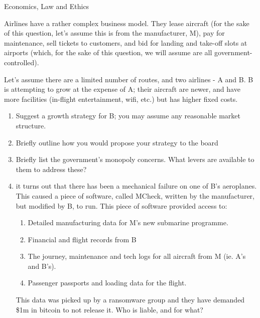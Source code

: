 \documentclass{tripos}  %
\begin{document}
\begin{question}[MockIB,year=2024,paper=2,question=3,author=rrw]{Economics, Law and Ethics}



Airlines have a rather complex business model. They lease aircraft
(for the sake of this question, let's assume this is from the
manufacturer, M), pay for maintenance, sell tickets to customers, and bid
for landing and take-off slots at airports (which, for the sake of
this question, we will assume are all government-controlled).

Let's assume there are a limited number of routes, and two airlines -
A and B. B is attempting to grow at the expense of A; their aircraft
are newer, and have more facilities (in-flight entertainment, wifi,
etc.) but has higher fixed costs.

\begin{enumerate}
\item Suggest a growth strategy for B; you may assume any reasonable market structure. 
\item Briefly outline how you would propose your strategy to the board 
\item Briefly list the government's monopoly concerns. What levers are available to them to address these? 
\item it turns out that there has been a mechanical failure on one of B's aeroplanes. This caused a piece of software, called MCheck, written by the manufacturer, but modified by B, to run. This piece of software provided access to:
  \begin{enumerate}
  \item Detailed manufacturing data for M's new submarine programme.
  \item Financial and flight records from B
  \item The journey, maintenance and tech logs for all aircraft from M (ie. A's and B's).
  \item Passenger passports and loading data for the flight.
  \end{enumerate}


  This data was picked up by a ransomware group and they have demanded \$1m in bitcoin to not release it.
  Who is liable, and for what?
\end{enumerate}
\end{question}
\end{document}
